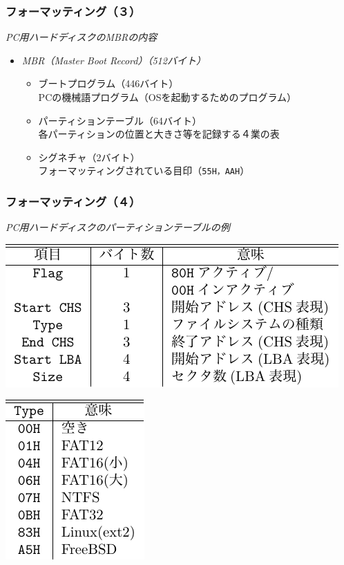 \documentclass{beamer}                   %
\begin{document}
\begin{frame}
  \frametitle{フォーマッティング（３）}
  \emph{PC用ハードディスクのMBRの内容}
  \begin{itemize}
  \item \emph{MBR（Master Boot Record）（512バイト）} \\
    \begin{itemize}
    \item ブートプログラム（446バイト） \\
      PCの機械語プログラム（OSを起動するためのプログラム）
    \item パーティションテーブル（64バイト） \\
      各パーティションの位置と大きさ等を記録する４業の表 \\
    \item シグネチャ（2バイト） \\
      フォーマッティングされている目印（\texttt{55H，AAH}）
    \end{itemize}
  \end{itemize}
\end{frame}

\begin{frame}
  \frametitle{フォーマッティング（４）}
  \emph{PC用ハードディスクのパーティションテーブルの例}
  \begin{center}
    \begin{minipage}{0.64\columnwidth}
      \centerline{\includegraphics[scale=0.8]
        {../Tbl/partitionTableEntry.pdf}}
    \end{minipage}
    \begin{minipage}{0.34\columnwidth}
      \centerline{\includegraphics[scale=0.8]
        {../Tbl/partitionTableType.pdf}}
    \end{minipage}
  \end{center}
\end{frame}
\end{document}
